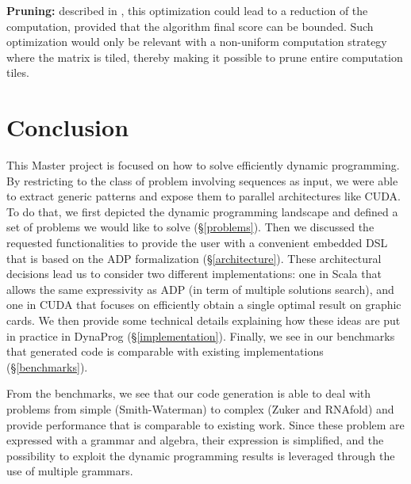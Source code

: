 \item \textbf{Pruning:} described in \cite{swat_mega}, this optimization could lead to a reduction of the computation, provided that the algorithm final score can be bounded. Such optimization would only be relevant with a non-uniform computation strategy where the matrix is tiled, thereby making it possible to prune entire computation tiles.
\ole

\newpage
\section{Conclusion}
This Master project is focused on how to solve efficiently dynamic programming. By restricting to the class of problem involving sequences as input, we were able to extract generic patterns and expose them to parallel architectures like CUDA. To do that, we first depicted the dynamic programming landscape and defined a set of problems we would like to solve (\S\ref{problems}). Then we discussed the requested functionalities to provide the user with a convenient embedded DSL that is based on the ADP formalization (\S\ref{architecture}). These architectural decisions lead us to consider two different implementations: one in Scala that allows the same expressivity as ADP (in term of multiple solutions search), and one in CUDA that focuses on efficiently obtain a single optimal result on graphic cards. We then provide some technical details explaining how these ideas are put in practice in DynaProg (\S\ref{implementation}). Finally, we see in our benchmarks that generated code is comparable with existing implementations (\S\ref{benchmarks}).

From the benchmarks, we see that our code generation is able to deal with problems from simple (Smith-Waterman) to complex (Zuker and RNAfold) and provide performance that is comparable to existing work. Since these problem are expressed with a grammar and algebra, their expression is simplified, and the possibility to exploit the dynamic programming results is leveraged through the use of multiple grammars.

